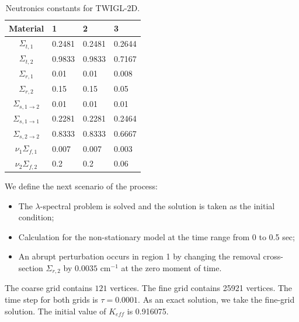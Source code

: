 \documentclass[preprint]{elsarticle}
\begin{document}
\begin{table}[ht]
\caption{\label{table:coeff}Neutronics constants for TWIGL-2D.}
	\label{twigl_const}
	\begin{center}
	\begin{tabular}{| c | l | l | l |}
		\hline
		Material & 1 & 2 & 3\\
		\hline 
		$\Sigma_{t,1}$				& 0.2481 & 0.2481 & 0.2644 \\
		$\Sigma_{t,2}$				& 0.9833 & 0.9833 & 0.7167 \\
		$\Sigma_{r,1}$				& 0.01   & 0.01   & 0.008  \\
		$\Sigma_{r,2}$				& 0.15   & 0.15   & 0.05   \\	
		$\Sigma_{s,1\rightarrow2}$ 	& 0.01   & 0.01   & 0.01   \\
		$\Sigma_{s,1\rightarrow1}$	& 0.2281 & 0.2281 & 0.2464 \\
		$\Sigma_{s,2\rightarrow2}$	& 0.8333 & 0.8333 & 0.6667 \\
		$\nu_1\Sigma_{f,1}$			& 0.007  & 0.007  & 0.003  \\
		$\nu_2\Sigma_{f,2}$			& 0.2    & 0.2    & 0.06   \\
		\hline
	\end{tabular}
	\end{center}
\end{table}

We define the next scenario of the process:
\begin{itemize}
	\item The $\lambda$-spectral problem is solved and the solution is taken as the initial condition;
	\item Calculation for the non-stationary model at the time range from 0 to 0.5 sec;
	\item An abrupt perturbation occurs in region 1 by changing the removal cross-section $\Sigma_{r,2}$ by $0.0035$ cm$^{-1}$ at the zero moment of time.
\end{itemize}

The coarse grid contains $121$ vertices.
The fine grid contains 25921 vertices. 
The time step for both grids is $\tau = 0.0001$.
As an exact solution, we take the fine-grid solution.
The initial value of $K_{eff}$ is 0.916075. 
\end{document}
